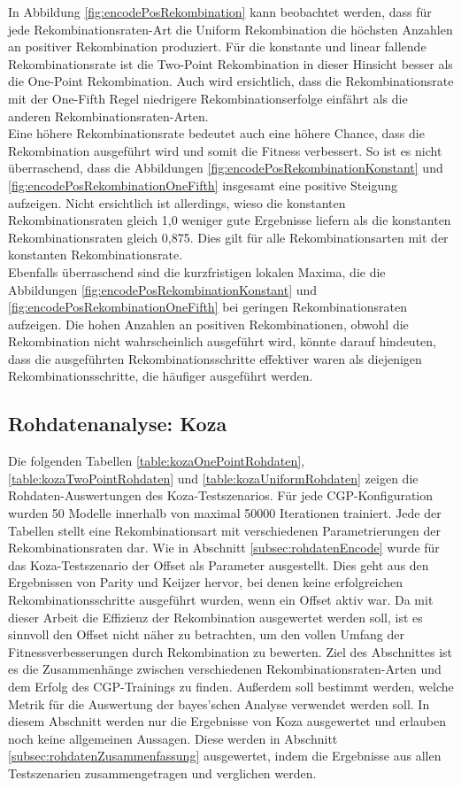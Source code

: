 In Abbildung \ref{fig:encodePosRekombination} kann beobachtet werden, dass für jede Rekombinationsraten-Art die Uniform Rekombination die höchsten Anzahlen an positiver Rekombination produziert.
Für die konstante und linear fallende Rekombinationsrate ist die Two-Point Rekombination in dieser Hinsicht besser als die One-Point Rekombination.
Auch wird ersichtlich, dass die Rekombinationsrate mit der One-Fifth Regel niedrigere Rekombinationserfolge einfährt als die anderen Rekombinationsraten-Arten.\\
Eine höhere Rekombinationsrate bedeutet auch eine höhere Chance, dass die Rekombination ausgeführt wird und somit die Fitness verbessert.
So ist es nicht überraschend, dass die Abbildungen \ref{fig:encodePosRekombinationKonstant} und \ref{fig:encodePosRekombinationOneFifth} insgesamt eine positive Steigung aufzeigen.
Nicht ersichtlich ist allerdings, wieso die konstanten Rekombinationsraten gleich 1,0 weniger gute Ergebnisse liefern als die konstanten Rekombinationsraten gleich 0,875.
Dies gilt für alle Rekombinationsarten mit der konstanten Rekombinationsrate.\\
Ebenfalls überraschend sind die kurzfristigen lokalen Maxima, die die Abbildungen \ref{fig:encodePosRekombinationKonstant} und \ref{fig:encodePosRekombinationOneFifth} bei geringen Rekombinationsraten aufzeigen.
Die hohen Anzahlen an positiven Rekombinationen, obwohl die Rekombination nicht wahrscheinlich ausgeführt wird, könnte darauf hindeuten, dass die ausgeführten Rekombinationsschritte effektiver waren als diejenigen Rekombinationsschritte, die häufiger ausgeführt werden.


\subsection{Rohdatenanalyse: Koza}
\label{subsec:rohdatenKoza}

Die folgenden Tabellen \ref{table:kozaOnePointRohdaten}, \ref{table:kozaTwoPointRohdaten} und \ref{table:kozaUniformRohdaten} zeigen die Rohdaten-Auswertungen des Koza-Testszenarios.
Für jede CGP-Konfiguration wurden 50 Modelle innerhalb von maximal 50000 Iterationen trainiert.
Jede der Tabellen stellt eine Rekombinationsart mit verschiedenen Parametrierungen der Rekombinationsraten dar.
Wie in Abschnitt \ref{subsec:rohdatenEncode} wurde für das Koza-Testszenario der Offset als Parameter ausgestellt.
Dies geht aus den Ergebnissen von Parity und Keijzer hervor, bei denen keine erfolgreichen Rekombinationsschritte ausgeführt wurden, wenn ein Offset aktiv war.
Da mit dieser Arbeit die Effizienz der Rekombination ausgewertet werden soll, ist es sinnvoll den Offset nicht näher zu betrachten, um den vollen Umfang der Fitnessverbesserungen durch Rekombination zu bewerten.
Ziel des Abschnittes ist es die Zusammenhänge zwischen verschiedenen Rekombinationsraten-Arten und dem Erfolg des CGP-Trainings zu finden.
Außerdem soll bestimmt werden, welche Metrik für die Auswertung der bayes'schen Analyse verwendet werden soll.
In diesem Abschnitt werden nur die Ergebnisse von Koza ausgewertet und erlauben noch keine allgemeinen Aussagen.
Diese werden in Abschnitt \ref{subsec:rohdatenZusammenfassung} ausgewertet, indem die Ergebnisse aus allen Testszenarien zusammengetragen und verglichen werden.


